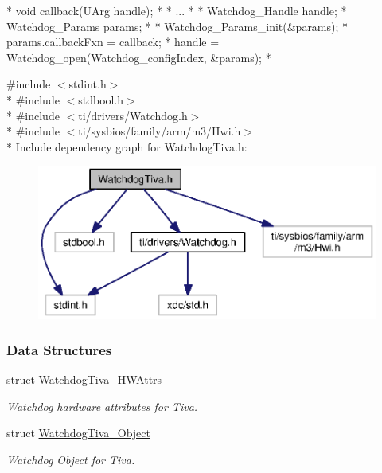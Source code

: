 \begin{DoxyCode}
*  \textcolor{keywordtype}{void} callback(UArg handle);
*
*  ...
*
*  Watchdog_Handle handle;
*  Watchdog_Params params;
*
*  Watchdog_Params_init(&params);
*  params.callbackFxn = callback;
*  handle = Watchdog_open(Watchdog\_configIndex, &params);
*  
\end{DoxyCode}


{\ttfamily \#include $<$stdint.\-h$>$}\\*
{\ttfamily \#include $<$stdbool.\-h$>$}\\*
{\ttfamily \#include $<$ti/drivers/\-Watchdog.\-h$>$}\\*
{\ttfamily \#include $<$ti/sysbios/family/arm/m3/\-Hwi.\-h$>$}\\*
Include dependency graph for Watchdog\-Tiva.\-h\-:
\nopagebreak
\begin{figure}[H]
\begin{center}
\leavevmode
\includegraphics[width=350pt]{_watchdog_tiva_8h__incl}
\end{center}
\end{figure}
\subsubsection*{Data Structures}
\begin{DoxyCompactItemize}
\item 
struct \hyperlink{struct_watchdog_tiva___h_w_attrs}{Watchdog\-Tiva\-\_\-\-H\-W\-Attrs}
\begin{DoxyCompactList}\small\item\em Watchdog hardware attributes for Tiva. \end{DoxyCompactList}\item 
struct \hyperlink{struct_watchdog_tiva___object}{Watchdog\-Tiva\-\_\-\-Object}
\begin{DoxyCompactList}\small\item\em Watchdog Object for Tiva. \end{DoxyCompactList}\end{DoxyCompactItemize}
